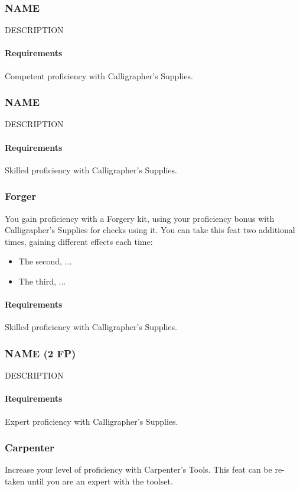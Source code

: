 \subsubsection{NAME} \label{feat::name}
    DESCRIPTION
    \paragraph{Requirements} Competent proficiency with Calligrapher's Supplies.
\subsubsection{NAME} \label{feat::name}
    DESCRIPTION
    \paragraph{Requirements} Skilled proficiency with Calligrapher's Supplies.
\subsubsection{Forger} \label{feat::forger}
    You gain proficiency with a Forgery kit, using your proficiency bonus with Calligrapher's Supplies for checks using it.
    You can take this feat two additional times, gaining different effects each time:
    \begin{itemize}
        \item The second, ...
        \item The third, ...
    \end{itemize}
    \paragraph{Requirements} Skilled proficiency with Calligrapher's Supplies.
\subsubsection{NAME (2 FP)} \label{feat::name}
    DESCRIPTION
    \paragraph{Requirements} Expert proficiency with Calligrapher's Supplies.
\subsubsection{Carpenter} \label{feat::carpenter}
    Increase your level of proficiency with Carpenter's Tools.
    This feat can be re-taken until you are an expert with the toolset.
